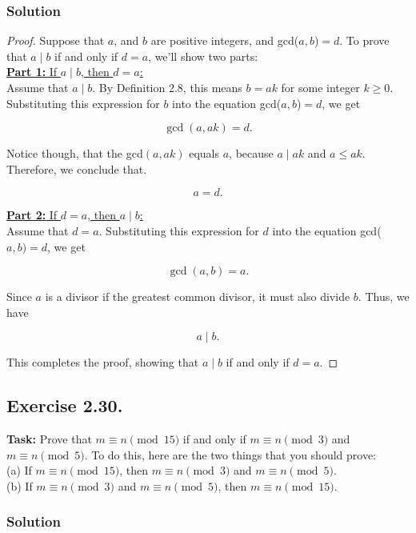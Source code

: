 \documentclass{article}
\begin{document}
\subsubsection*{Solution}

\begin{proof}
    Suppose that $a$, and $b$ are positive integers, and gcd($a,b$)$=d$. To prove that $a\mid b$ if and only if $d=a$, we'll show two parts:\\

    \underline{\textbf{Part 1:} If $a\mid b$, then $d=a$:}\\
    Assume that $a \mid b$. By Definition 2.8, this means $b=ak$ for some integer $k \geq 0$. Substituting this expression for $b$ into the equation gcd($a,b$)$=d$, we get

    \[\gcd(a,ak)=d.\]

    Notice though, that the gcd$(a,ak)$ equals $a$, because $a\mid ak$ and $a \leq ak$. Therefore, we conclude that.

        \[a=d.\]

    \underline{\textbf{Part 2:} If $d=a$, then $a\mid b$:}\\
    Assume that $d=a$. Substituting this expression for $d$ into the equation gcd($a,b)=d$, we get 

    \[ \gcd(a,b)=a.\]

    Since $a$ is a divisor if the greatest common divisor, it must also divide $b$. Thus, we have
    
    \[a\mid b.\]

    This completes the proof, showing that $a\mid b$ if and only if $d=a$.
\end{proof}

\newpage

\subsection{Exercise 2.30.}
\textbf{Task:} Prove that $m \equiv n \pmod{15}$ if and only if $m \equiv n \pmod{3}$ and $m \equiv n \pmod{5}$. To do this, here are the two things that you should prove:\\
(a) If $m \equiv n \pmod{15}$, then $m \equiv n \pmod{3}$ and $m \equiv n \pmod{5}$.\\
(b) If $m \equiv n \pmod{3}$ and $m \equiv n \pmod{5}$, then $m \equiv n \pmod{15}$.

\subsubsection*{Solution}
\end{document}

